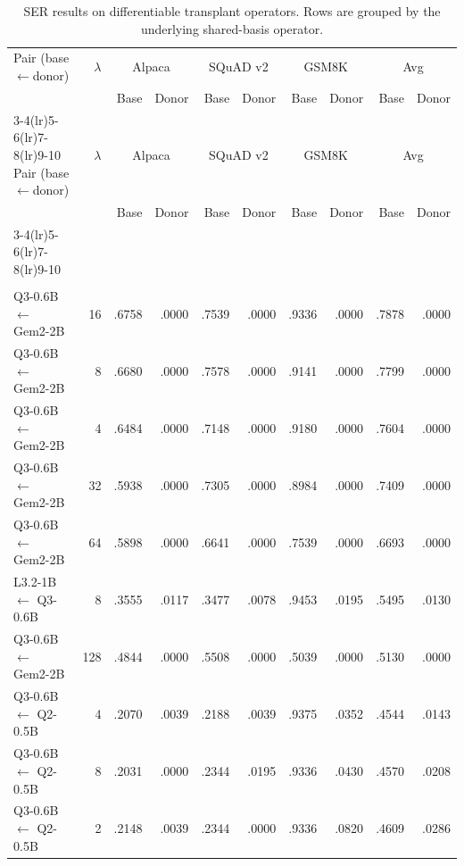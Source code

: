 \documentclass{article}
\theoremstyle{plain}
\theoremstyle{definition}
\theoremstyle{remark}
\begin{document}
\begin{longtable}{p{}rrrrrrrrr}
\caption{SER results on differentiable transplant operators. Rows are grouped by the underlying shared-basis operator.}\label{tab:app:altops:ser} \\
\toprule
Pair (base$\leftarrow$donor) & $\lambda$ & \multicolumn{2}{c}{Alpaca} & \multicolumn{2}{c}{SQuAD v2} & \multicolumn{2}{c}{GSM8K} & \multicolumn{2}{c}{Avg} \\
 & & Base & Donor & Base & Donor & Base & Donor & Base & Donor \\
\cmidrule(lr){3-4}\cmidrule(lr){5-6}\cmidrule(lr){7-8}\cmidrule(lr){9-10}
\midrule
\endfirsthead
\toprule
Pair (base$\leftarrow$donor) & $\lambda$ & \multicolumn{2}{c}{Alpaca} & \multicolumn{2}{c}{SQuAD v2} & \multicolumn{2}{c}{GSM8K} & \multicolumn{2}{c}{Avg} \\
 & & Base & Donor & Base & Donor & Base & Donor & Base & Donor \\
\cmidrule(lr){3-4}\cmidrule(lr){5-6}\cmidrule(lr){7-8}\cmidrule(lr){9-10}
\midrule
\endhead
\midrule \multicolumn{10}{r}{\emph{Continued on next page}} \\
\endfoot
\bottomrule
\endlastfoot
\multicolumn{10}{l}{\textbf{FOCUS}} \\
\addlinespace[2pt]
Q3-0.6B $\leftarrow$ Gem2-2B & 16 & .6758 & .0000 & .7539 & .0000 & .9336 & .0000 & .7878 & .0000 \\
Q3-0.6B $\leftarrow$ Gem2-2B & 8 & .6680 & .0000 & .7578 & .0000 & .9141 & .0000 & .7799 & .0000 \\
Q3-0.6B $\leftarrow$ Gem2-2B & 4 & .6484 & .0000 & .7148 & .0000 & .9180 & .0000 & .7604 & .0000 \\
Q3-0.6B $\leftarrow$ Gem2-2B & 32 & .5938 & .0000 & .7305 & .0000 & .8984 & .0000 & .7409 & .0000 \\
Q3-0.6B $\leftarrow$ Gem2-2B & 64 & .5898 & .0000 & .6641 & .0000 & .7539 & .0000 & .6693 & .0000 \\
L3.2-1B $\leftarrow$ Q3-0.6B & 8 & .3555 & .0117 & .3477 & .0078 & .9453 & .0195 & .5495 & .0130 \\
Q3-0.6B $\leftarrow$ Gem2-2B & 128 & .4844 & .0000 & .5508 & .0000 & .5039 & .0000 & .5130 & .0000 \\
Q3-0.6B $\leftarrow$ Q2-0.5B & 4 & .2070 & .0039 & .2188 & .0039 & .9375 & .0352 & .4544 & .0143 \\
Q3-0.6B $\leftarrow$ Q2-0.5B & 8 & .2031 & .0000 & .2344 & .0195 & .9336 & .0430 & .4570 & .0208 \\
Q3-0.6B $\leftarrow$ Q2-0.5B & 2 & .2148 & .0039 & .2344 & .0000 & .9336 & .0820 & .4609 & .0286 \\

\end{longtable}
\end{document}
